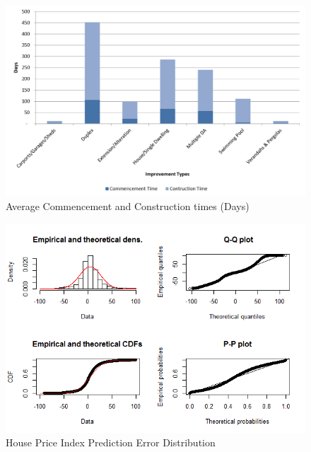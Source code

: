 \documentclass[AEJ,reqno, draftmode]{AEA} %
\begin{document}
\appendix


\renewcommand{\thetable}{A\arabic{table}}


\restoregeometry 



\restoregeometry 


\clearpage


\begin{figure}[!h]
    \centering
     \includegraphics[width=\columnwidth]{Figures/Cm_ct_times.png} \par
 \caption{Average Commencement and Construction times (Days)}
 \label{fig:Cm_ct_times}
\end{figure}


%
\clearpage


\begin{figure}[!htb]
    \centering
     \includegraphics[width=\columnwidth]{Figures/Rplot_qqplot.png} \par
 \caption{House Price Index Prediction Error Distribution}
 \label{fig:Rplot_ssd_err_10}
\end{figure}

\section{}
\end{document}

